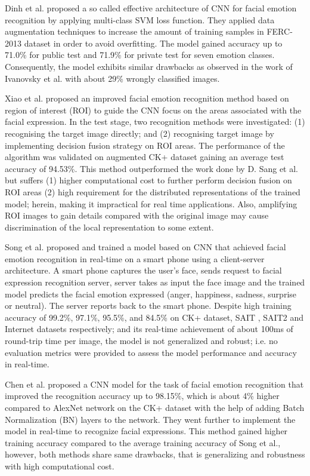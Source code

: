\documentclass[master]{thesis-uestc}
\begin{document}
Dinh et al.\cite{sang-2017} proposed a so called effective architecture of CNN for facial emotion recognition by applying multi-class SVM loss function. They applied data augmentation techniques to increase the amount of training samples in FERC-2013 dataset\cite{kaggle_ferc} in order to avoid overfitting. The model gained accuracy up to 71.0\% for public test and 71.9\% for private test for seven emotion classes. Consequently, the model exhibits similar drawbacks as observed in the work of Ivanovsky et al.\cite{Ivanovsky-2017} with about 29\% wrongly classified images.

Xiao et al.\cite{8273609} proposed an improved facial emotion recognition method based on region of interest (ROI) to guide the CNN focus on the areas associated with the facial expression. In the test stage, two recognition methods were investigated: (1) recognising the target image directly; and (2) recognising target image by implementing decision fusion strategy on ROI areas.  The performance of the algorithm was validated on augmented CK+ dataset gaining an average test accuracy of 94.53\%. This method outperformed the work done by D. Sang et al.\cite{sang-2017} but suffers (1) higher computational cost to further perform decision fusion on ROI areas (2) high requirement for the distributed representations of the trained model; herein, making it impractical for real time applications. Also, amplifying ROI images to gain details compared with the original image may cause discrimination of the local representation to some extent.

Song et al.\cite{6776135} proposed and trained a model based on CNN that achieved facial emotion recognition in real-time on a smart phone using a client-server architecture. A smart phone captures the user's face, sends request to facial expression recognition server, server takes as input the face image and the trained model predicts the facial emotion expressed (anger, happiness, sadness, surprise or neutral). The server reports back to the smart phone. Despite high training accuracy of 99.2\%, 97.1\%, 95.5\%, and 84.5\% on CK+ dataset, SAIT , SAIT2  and Internet  datasets respectively; and its real-time achievement of about 100ms of round-trip time per image, the model is  not generalized and robust; i.e. no evaluation metrics were provided to assess the model performance and accuracy in real-time.

Chen et al.\cite{7988558} proposed a CNN model for the task of facial emotion recognition that improved the recognition accuracy up to 98.15\%, which is about 4\% higher compared to AlexNet network on the CK+ dataset with the help of adding Batch Normalization (BN) layers to the network. They went further to implement the model in real-time to recognize facial expressions. This method gained higher training accuracy compared to the average training accuracy of Song et al.\cite{6776135}, however, both methods share same drawbacks, that is generalizing and robustness with high computational cost.
\end{document}
